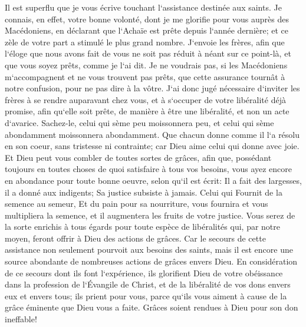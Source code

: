 \verse Il est superflu que je vous écrive touchant l`assistance destinée aux saints. 
\verse Je connais, en effet, votre bonne volonté, dont je me glorifie pour vous auprès des Macédoniens, en déclarant que l`Achaïe est prête depuis l`année dernière; et ce zèle de votre part a stimulé le plus grand nombre. 
\verse J`envoie les frères, afin que l`éloge que nous avons fait de vous ne soit pas réduit à néant sur ce point-là, et que vous soyez prêts, comme je l`ai dit. 
\verse Je ne voudrais pas, si les Macédoniens m`accompagnent et ne vous trouvent pas prêts, que cette assurance tournât à notre confusion, pour ne pas dire à la vôtre. 
\verse J`ai donc jugé nécessaire d`inviter les frères à se rendre auparavant chez vous, et à s`occuper de votre libéralité déjà promise, afin qu`elle soit prête, de manière à être une libéralité, et non un acte d`avarice. 
\verse Sachez-le, celui qui sème peu moissonnera peu, et celui qui sème abondamment moissonnera abondamment. 
\verse Que chacun donne comme il l`a résolu en son coeur, sans tristesse ni contrainte; car Dieu aime celui qui donne avec joie. 
\verse Et Dieu peut vous combler de toutes sortes de grâces, afin que, possédant toujours en toutes choses de quoi satisfaire à tous vos besoins, vous ayez encore en abondance pour toute bonne oeuvre, 
\verse selon qu`il est écrit: Il a fait des largesses, il a donné aux indigents; Sa justice subsiste à jamais. 
\verse Celui qui Fournit de la semence au semeur, Et du pain pour sa nourriture, vous fournira et vous multipliera la semence, et il augmentera les fruits de votre justice. 
\verse Vous serez de la sorte enrichis à tous égards pour toute espèce de libéralités qui, par notre moyen, feront offrir à Dieu des actions de grâces. 
\verse Car le secours de cette assistance non seulement pourvoit aux besoins des saints, mais il est encore une source abondante de nombreuses actions de grâces envers Dieu. 
\verse En considération de ce secours dont ils font l`expérience, ils glorifient Dieu de votre obéissance dans la profession de l`Évangile de Christ, et de la libéralité de vos dons envers eux et envers tous; 
\verse ils prient pour vous, parce qu`ils vous aiment à cause de la grâce éminente que Dieu vous a faite. 
\verse Grâces soient rendues à Dieu pour son don ineffable! 

\chapter{}

